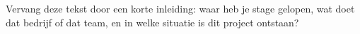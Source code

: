 
\chapter{}%
\label{ch:inleiding}


Vervang deze tekst door een korte inleiding: waar heb je stage gelopen, wat
doet dat bedrijf of dat team, en in welke situatie is dit project ontstaan?

\section{}%
\label{sec:probleemstelling}


\section{}%
\label{sec:doelstelling}


\section{}%
\label{sec:afbakening}


